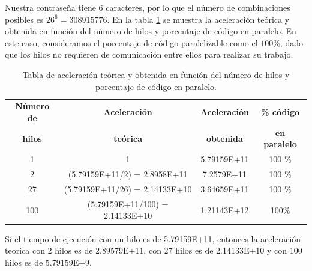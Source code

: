 \documentclass{article}
\begin{document}
Nuestra contraseña tiene 6 caracteres, por lo que el número de combinaciones posibles es $26^6 = 308 915 776$. En la tabla \ref{tab:aceleracion-teorica-obtenida} se muestra la aceleración teórica y obtenida en función del número de hilos y porcentaje de código en paralelo.
En este caso, consideramos el porcentaje de código paralelizable como el $100\%$, dado que los hilos no requieren de comunicación entre ellos para realizar su trabajo.

\begin{table}[h]
\centering
\begin{tabular}{|c|c|c|c|}
\hline
\textbf{Número de} & \textbf{Aceleración} & \textbf{Aceleración} & \textbf{\% código} \\
\textbf{hilos} & \textbf{teórica} & \textbf{obtenida} & \textbf{en paralelo} \\
\hline
1 & 1 & 5.79159E+11 & 100 \% \\
2 & (5.79159E+11/2) = 2.8958E+11 & 7.2579E+11 & 100 \%  \\
27 & (5.79159E+11/26) = 2.14133E+10 & 3.64659E+11 & 100 \%  \\
100 & (5.79159E+11/100) = 2.14133E+10 & 1.21143E+12 & 100\% \\
\hline
\end{tabular}
\caption{Tabla de aceleración teórica y obtenida en función del número de hilos y porcentaje de código en paralelo.}
\label{tab:aceleracion-teorica-obtenida}
\end{table}
Si el tiempo de ejecución con un hilo es de 5.79159E+11, entonces la aceleración teorica con 2 hilos es de 2.89579E+11, con 27 hilos es de 2.14133E+10 y con 100 hilos es de 5.79159E+9.
\end{document}
